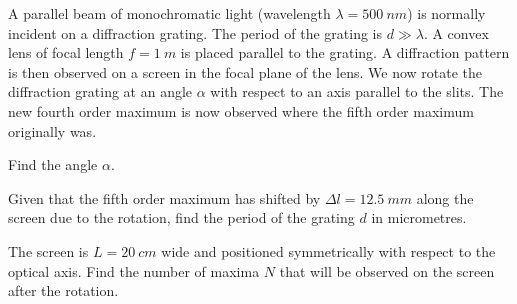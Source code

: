 \documentclass[../TST.tex]{subfiles}
\begin{document}
\begin{pproblem}
A parallel beam of monochromatic light (wavelength $\lambda=\qty{500}{nm}$) is normally incident on a diffraction grating. The period of the grating is $d\gg \lambda$. A convex lens of focal length $f=\qty{1}{m}$ is placed parallel to the grating. A diffraction pattern is then observed on a screen in the focal plane of the lens. We now rotate the diffraction grating at an angle $\alpha$ with respect to an axis parallel to the slits. The new fourth order maximum is now observed where the fifth order maximum originally was.
\begin{subpart}
	\item Find the angle $\alpha$. 
	\item Given that the fifth order maximum has shifted by $\Delta l=\qty{12.5}{mm}$ along the screen due to the rotation, find the period of the grating $d$ in micrometres. 
	\item The screen is $L=\qty{20}{cm}$ wide and positioned symmetrically with respect to the optical axis. Find the number of maxima $N$ that will be observed on the screen after the rotation. 
\end{subpart}
\end{pproblem}
\end{document}
